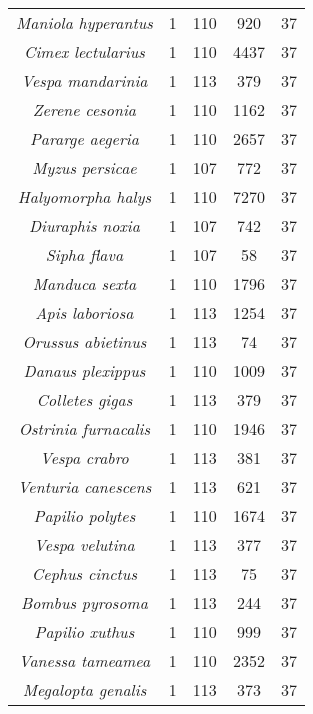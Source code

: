 \begin{longtable}[c]{|c|c|c|c|c|}
\textit{Maniola hyperantus}               & 1    & 110 & 920  & 37 \\
\textit{Cimex lectularius}                & 1    & 110 & 4437 & 37 \\
\textit{Vespa mandarinia}                 & 1    & 113 & 379  & 37 \\
\textit{Zerene cesonia}                   & 1    & 110 & 1162 & 37 \\
\textit{Pararge aegeria}                  & 1    & 110 & 2657 & 37 \\
\textit{Myzus persicae}                   & 1    & 107 & 772  & 37 \\
\textit{Halyomorpha halys}                & 1    & 110 & 7270 & 37 \\
\textit{Diuraphis noxia}                  & 1    & 107 & 742  & 37 \\
\textit{Sipha flava}                      & 1    & 107 & 58   & 37 \\
\textit{Manduca sexta}                    & 1    & 110 & 1796 & 37 \\
\textit{Apis laboriosa}                   & 1    & 113 & 1254 & 37 \\
\textit{Orussus abietinus}                & 1    & 113 & 74   & 37 \\
\textit{Danaus plexippus}                 & 1    & 110 & 1009 & 37 \\
\textit{Colletes gigas}                   & 1    & 113 & 379  & 37 \\
\textit{Ostrinia furnacalis}              & 1    & 110 & 1946 & 37 \\
\textit{Vespa crabro}                     & 1    & 113 & 381  & 37 \\
\textit{Venturia canescens}               & 1    & 113 & 621  & 37 \\
\textit{Papilio polytes}                  & 1    & 110 & 1674 & 37 \\
\textit{Vespa velutina}                   & 1    & 113 & 377  & 37 \\
\textit{Cephus cinctus}                   & 1    & 113 & 75   & 37 \\
\textit{Bombus pyrosoma}                  & 1    & 113 & 244  & 37 \\
\textit{Papilio xuthus}                   & 1    & 110 & 999  & 37 \\
\textit{Vanessa tameamea}                 & 1    & 110 & 2352 & 37 \\
\textit{Megalopta genalis}                & 1    & 113 & 373  & 37 \\

\end{longtable}
